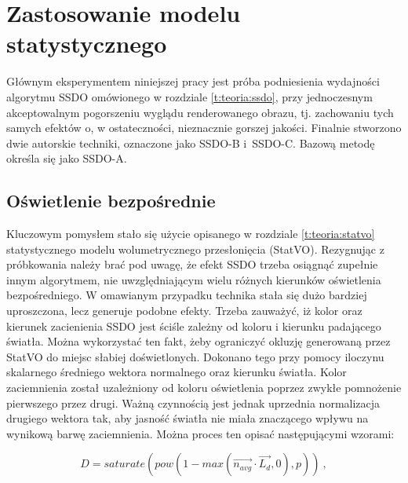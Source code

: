 	\section{Zastosowanie modelu statystycznego}
	\label{t:algorytm:stat}
	
	
	Głównym eksperymentem niniejszej pracy jest próba podniesienia wydajności algorytmu SSDO omówionego w rozdziale \ref{t:teoria:ssdo}, przy jednoczesnym akceptowalnym pogorszeniu wyglądu renderowanego obrazu, tj. zachowaniu tych samych efektów o, w ostateczności, nieznacznie gorszej jakości. Finalnie stworzono dwie autorskie techniki, oznaczone jako SSDO-B i~SSDO-C. Bazową metodę określa się jako SSDO-A.
	
		\subsection{Oświetlenie bezpośrednie}
		\label{t:algorytm:stat:direct}
		
		Kluczowym pomysłem stało się użycie opisanego w rozdziale \ref{t:teoria:statvo} statystycznego modelu wolumetrycznego przesłonięcia (StatVO). Rezygnując z próbkowania należy brać pod uwagę, że efekt SSDO trzeba osiągnąć zupełnie innym algorytmem, nie uwzględniającym wielu różnych kierunków oświetlenia bezpośredniego. W omawianym przypadku technika stała się dużo bardziej uproszczona, lecz generuje podobne efekty. Trzeba zauważyć, iż kolor oraz kierunek zacienienia SSDO jest ściśle zależny od koloru i kierunku padającego światła. Można wykorzystać ten fakt, żeby ograniczyć okluzję generowaną przez StatVO do miejsc słabiej doświetlonych. Dokonano tego przy pomocy iloczynu skalarnego średniego wektora normalnego oraz kierunku światła. Kolor zaciemnienia został uzależniony od koloru oświetlenia poprzez zwykłe pomnożenie pierwszego przez drugi. Ważną czynnością jest jednak uprzednia normalizacja drugiego wektora tak, aby jasność światła nie miała znaczącego wpływu na wynikową barwę zaciemnienia. Można proces ten opisać następującymi wzorami:
		
		\begin{equation}
		D = saturate(pow(1 - max(\vec{n_{avg}} \cdot \vec{L_{d}}, 0), p))\ ,
		\end{equation}
		
